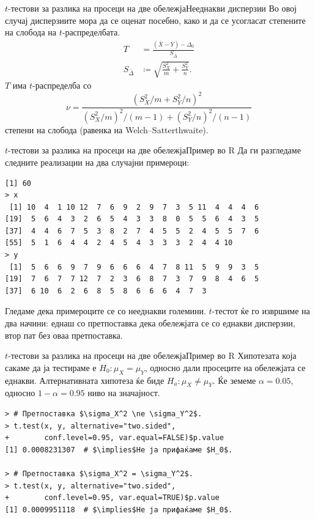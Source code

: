 \documentclass[hyperref={unicode}, xcolor={svgnames, table},
usepdftitle=false]{beamer}
\theoremstyle{remark}
\begin{document}
\begin{frame}{\(t\)-тестови за разлика на просеци на две
    обележја}{Нееднакви дисперзии}
  Во овој случај дисперзиите мора да се оценат посебно, како и да се усогласат
  степените на слобода на \(t\)-распределбата.
  \begin{align*}
    T &= \frac{(\bar{X} - \bar{Y}) - \Delta_0}{S_{\bar{\Delta}}} \\
    S_{\bar{\Delta}} &\coloneqq \sqrt{\frac{S_X^2}{m} + \frac{S_Y^2}{n}}\text{.}
  \end{align*}
  \(T\) има \(t\)-распределба со
  \[
    \nu = \frac{(S_X^2 / {m} + S_Y^2 / {n})^2}{(S_X^2 / {m})^2 / {(m - 1)} +
      (S_Y^2 / {n})^2 / {(n - 1)}}
  \]
  степени на слобода (равенка на Welch--Satterthwaite).
\end{frame}

\begin{frame}[fragile]{\(t\)-тестови за разлика на просеци на две
    обележја}{Пример во R}
  Да ги разгледаме следните реализации на два случајни примероци:
\begin{verbatim}
[1] 60
> x
 [1] 10  4  1 10 12  7  6  9  2  9  7  3  5 11  4  4  4  6
[19]  5  6  4  3  2  6  5  4  3  3  8  0  5  5  6  4  3  5
[37]  4  4  6  7  5  3  8  2  7  4  5  5  2  4  5  5  7  6
[55]  5  1  6  4  4  2  4  5  4  3  3  3  2  4  4 10
> y
 [1]  5  6  6  9  7  9  6  6  6  4  7  8 11  5  9  9  3  5
[19]  7  6  7  7 12  7  2  3  6  8  7  3  7  9  8  4  6  5
[37]  6 10  6  2  6  8  5  8  6  6  6  4  7  3
\end{verbatim}
  Гледаме дека примероците се со нееднакви големини.  \(t\)-тестот ќе го
  извршиме на два начини: еднаш со претпоставка дека обележјата се со еднакви
  дисперзии, втор пат без оваа претпоставка.
\end{frame}

\begin{frame}[fragile]{\(t\)-тестови за разлика на просеци на две
    обележја}{Пример во R}
  Хипотезата која сакаме да ја тестираме е \(H_0 \colon \mu_X = \mu_Y\), односно
  дали просеците на обележјата се еднакви.  Алтернативната хипотеза ќе биде
  \(H_a \colon \mu_X \ne \mu_Y\).  Ќе земеме \(\alpha = \num{0.05}\), односно \(1
  - \alpha = \num{0.95}\) ниво на значајност.
\begin{verbatim}
> # Претпоставка $\sigma_X^2 \ne \sigma_Y^2$.
> t.test(x, y, alternative="two.sided",
+        conf.level=0.95, var.equal=FALSE)$p.value
[1] 0.0008231307  # $\implies$Не ја прифаќаме $H_0$.

> # Претпоставка $\sigma_X^2 = \sigma_Y^2$.
> t.test(x, y, alternative="two.sided",
+        conf.level=0.95, var.equal=TRUE)$p.value
[1] 0.0009951118  # $\implies$Не ја прифаќаме $H_0$.
\end{verbatim}
\end{frame}
\end{document}
